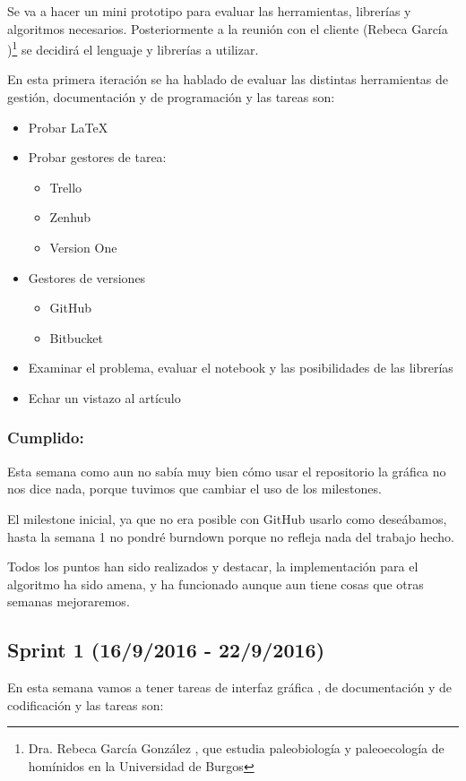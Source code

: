 Se va a hacer un mini prototipo para evaluar las herramientas, librerías y algoritmos necesarios. Posteriormente a la reunión con el cliente (Rebeca García \cite{Rebeca:garcia})\footnote{ Dra. Rebeca García González \cite{ubu:Rebe},  que estudia paleobiología y paleoecología de homínidos en la Universidad de Burgos} se decidirá el lenguaje y librerías a utilizar.

En esta primera iteración se ha hablado de evaluar las distintas herramientas de gestión, documentación y de programación y las tareas son:


\begin{itemize}
	\item Probar \LaTeX 
	\item Probar gestores de tarea: 
	\begin{itemize}
	\item Trello 
	\item Zenhub 
	\item Version One
	\end{itemize}
	\item Gestores de versiones 
	\begin{itemize}
	\item GitHub 
	\item Bitbucket 
	\end{itemize}
	\item Examinar el problema, evaluar el notebook y las posibilidades de las librerías 
	\item Echar un vistazo al artículo 
\end{itemize}

\subsubsection{Cumplido:}
Esta semana como aun no sabía muy bien cómo usar el repositorio  la gráfica no nos dice nada, porque tuvimos que cambiar el uso de los milestones.

El milestone inicial, ya que no era posible con GitHub usarlo como deseábamos, hasta la semana 1 no pondré burndown porque no refleja nada del trabajo hecho.

Todos los puntos han sido realizados y destacar, la implementación para el algoritmo ha sido amena, y ha funcionado aunque aun tiene cosas que otras semanas mejoraremos.

\subsection{Sprint 1 (16/9/2016 - 22/9/2016)}
 En esta semana vamos a tener tareas de interfaz gráfica , de documentación y de codificación y las tareas son:

